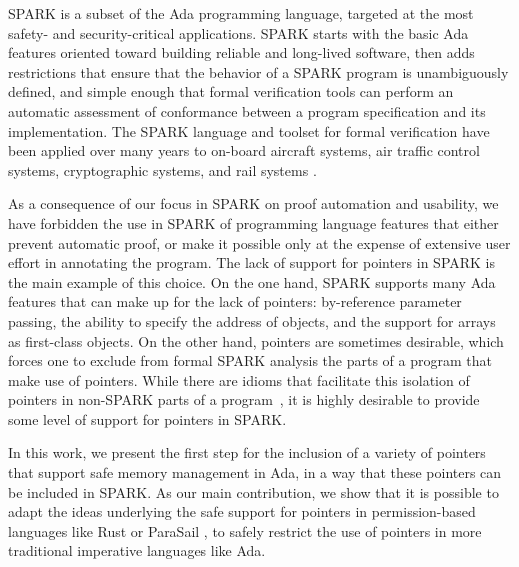 \documentclass{llncs}
\begin{document}
\smallskip
SPARK is a subset of the Ada programming language, targeted at the most safety- and security-critical applications. SPARK starts with the basic Ada features oriented toward building reliable and long-lived software, then adds restrictions that ensure that the behavior of a SPARK program is unambiguously defined, and simple enough that formal verification tools can perform an automatic assessment of conformance between a program specification and its implementation. The SPARK language and toolset for formal verification have been applied over many years to on-board aircraft systems,
air traffic control systems, cryptographic systems, and rail systems \cite{ONeill2012, McCormick2015}.

As a consequence of our focus in SPARK on proof automation and usability, we have forbidden the use in SPARK of programming language features that either prevent automatic proof, or make it possible only at the expense of extensive user effort in annotating the program. The lack of support for pointers in SPARK is the main example of this choice. On the one hand, SPARK supports many Ada features that can make up for the lack of pointers: by-reference parameter passing, the ability to specify the address of objects, and the support for arrays as first-class objects. On the other hand, pointers are sometimes desirable, which forces one to exclude from formal SPARK analysis the parts of a program that make use of pointers. While there are idioms that facilitate this isolation of pointers in non-SPARK parts of a program~\cite{AdaCoreThalesSPARK}, it is highly desirable to provide some level of support for pointers in SPARK.

In this work, we present the first step for the inclusion of a variety of pointers that support safe memory management in Ada, in a way that these pointers can be included in SPARK. As our main contribution, we show that it is possible to adapt the ideas underlying the safe support for pointers in permission-based languages like Rust \cite{Balasubramanian17} or ParaSail \cite{Taft11}, to safely restrict the use of pointers in more traditional imperative languages like Ada. 
\end{document}
